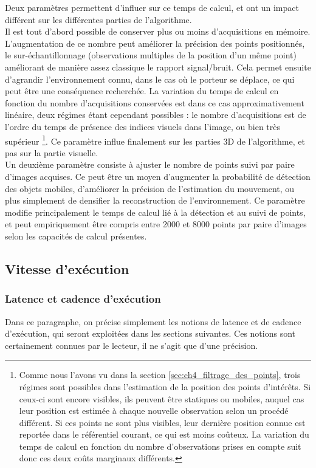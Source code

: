 Deux paramètres permettent d'influer sur ce temps de calcul, et ont un impact différent sur les différentes parties de l'algorithme. \\
Il est tout d'abord possible de conserver plus ou moins d'acquisitions en mémoire. L'augmentation de ce nombre peut améliorer la précision des points positionnés, le sur-échantillonnage (observations multiples de la position d'un même point) améliorant de manière assez classique le rapport signal/bruit. Cela permet ensuite d'agrandir l'environnement \og connu\fg{}, dans le cas où le porteur se déplace, ce qui peut être une conséquence recherchée. La variation du temps de calcul en fonction du nombre d'acquisitions conservées est dans ce cas approximativement linéaire, deux régimes étant cependant possibles : le nombre d'acquisitions est de l'ordre du temps de présence des indices visuels dans l'image, ou bien très supérieur \footnote{Comme nous l'avons vu dans la section \ref{sec:ch4_filtrage_des_points}, trois régimes sont possibles dans l'estimation de la position des points d'intérêts. Si ceux-ci sont encore visibles, ils peuvent être statiques ou mobiles, auquel cas leur position est estimée à chaque nouvelle observation selon un procédé différent. Si ces points ne sont plus visibles, leur dernière position connue est reportée dans le référentiel courant, ce qui est moins coûteux. La variation du temps de calcul en fonction du nombre d'observations prises en compte suit donc ces deux coûts marginaux différents.}. Ce paramètre influe finalement sur les parties \og 3D\fg{} de l'algorithme, et pas sur la partie visuelle.\\
Un deuxième paramètre consiste à ajuster le nombre de points suivi par paire d'images acquises. Ce peut être un moyen d'augmenter la probabilité de détection des objets mobiles, d'améliorer la précision de l'estimation du mouvement, ou plus simplement de densifier la reconstruction de l'environnement. Ce paramètre modifie principalement le temps de calcul lié à la détection et au suivi de points, et peut empiriquement être compris entre 2000 et 8000 points par paire d'images selon les capacités de calcul présentes.\\

\subsection{Vitesse d'exécution}
\subsubsection{Latence et cadence d'exécution}
Dans ce paragraphe, on précise simplement les notions de latence et de cadence d'exécution, qui seront exploitées dans les sections suivantes. Ces notions sont certainement connues par le lecteur, il ne s'agit que d'une précision.


